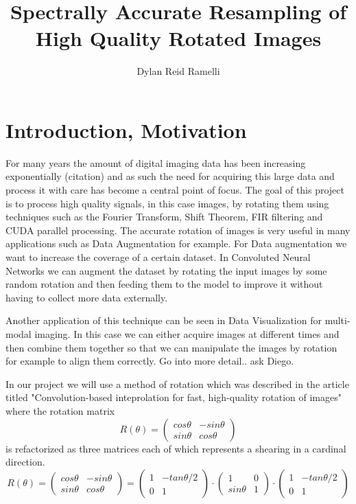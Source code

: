 \documentclass[]{usiinfbachelorproject}
\title{Spectrally Accurate Resampling of High Quality Rotated Images}
\author{Dylan Reid Ramelli}
\begin{document}
	
	\maketitle	
	\section{Introduction, Motivation}\label{introduction}
	For many years the amount of digital imaging data has been increasing exponentially (citation) and as such the need for acquiring this large data and process it with care has become a central point of focus. The goal of this project is to process high quality signals, in this case images, by rotating them using techniques such as the Fourier Transform, Shift Theorem, FIR filtering and CUDA parallel processing.
	The accurate rotation of images is very useful in many applications such as Data Augmentation for example. For Data augmentation we want to increase the coverage of a certain dataset. In Convoluted Neural Networks we can augment the dataset by rotating the input images by some random rotation and then feeding them to the model to improve it without having to collect more data externally. 
	
	Another application of this technique can be seen in Data Visualization for multi-modal imaging. In this case we can either acquire images at different times and then combine them together so that we can manipulate the images by rotation for example to align them correctly. Go into more detail.. ask Diego.
	
	In our project we will use a method of rotation which was described in the article titled "Convolution-based inteprolation for fast, high-quality rotation of images"\cite{main_article} where the rotation matrix
	\begin{equation*}
		R(\theta) = 
		\begin{pmatrix}
			cos\theta & -sin\theta\\
			sin\theta & cos\theta
		\end{pmatrix}
	\end{equation*} 
	is refactorized as three matrices each of which represents a shearing in a cardinal direction.
		\begin{equation*}
		R(\theta) = 
		\begin{pmatrix}
			cos\theta & -sin\theta\\
			sin\theta & cos\theta
		\end{pmatrix}
		=
		\begin{pmatrix}
			1 & -tan\theta/2\\
			0 & 1
		\end{pmatrix}
		\cdot
		\begin{pmatrix}
			1 & 0\\
			sin\theta & 1
		\end{pmatrix}
		\cdot
		\begin{pmatrix}
			1 & -tan\theta/2\\
			0 & 1
		\end{pmatrix}
	\end{equation*} 
	
\end{document}
